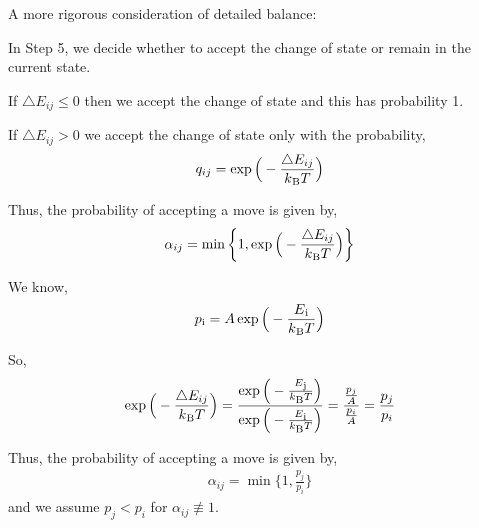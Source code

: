 \documentclass[12pt]{article}
\begin{document}
 A more rigorous consideration of detailed balance:
 
 In Step 5, we decide whether to accept the change of state or remain in the current state. 
 
 If $\triangle{E_{i j}} \leq 0$ then we accept the change of state and this has probability 1.
 
 If $\triangle{E_{i j}} > 0$ we accept the change of state only with the probability, 
 \begin{align} 
q_{i j} = \exp \Big(-\frac{\triangle{E_{i j}}}{k\textsubscript{B} T}\Big)
\end{align}
 
 Thus, the probability of accepting a move is given by,
  \begin{align} 
\alpha_{i j} = \min \bigg\{ 1, \exp \Big(-\frac{\triangle{E_{i j}}}{k\textsubscript{B} T}\Big) \bigg\}
\end{align}

We know, 
 \begin{align} 
p\textsubscript{i} = A\exp \Big( - \frac{E\textsubscript{i}}{k\textsubscript{B} T}\Big)
\end{align}

So,
 \begin{align} 
\exp \Big(-\frac{\triangle{E_{i j}}}{k\textsubscript{B} T}\Big) = 
\frac{\exp \Big( - \frac{E\textsubscript{j}}{k\textsubscript{B} T}\Big)}{
\exp \Big( - \frac{E\textsubscript{i}}{k\textsubscript{B} T}\Big)} = 
\frac{\frac{p_{j}}{A}}{\frac{p_{i}}{A}} =
\frac{p_{j}}{p_{i}}
 \end{align}
 
Thus, the probability of accepting a move is given by, 
\begin{align} 
\alpha_{i j} = \min \bigg\{ 1, \frac{p_{j}}{p_{i}} \bigg\}
\end{align}
and we assume $p_{j} < p_{i}$ for $\alpha_{i j} \not\equiv 1$.
\end{document}
